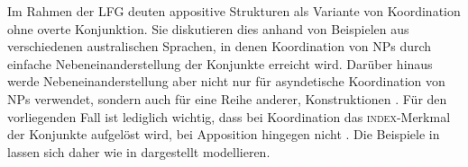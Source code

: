 Im Rahmen der LFG deuten \citet{sadlernordlinger2006} appositive Strukturen als
Variante von Koordination ohne overte Konjunktion. Sie diskutieren dies anhand
von Beispielen aus verschiedenen australischen Sprachen, in denen Koordination
von NPs durch einfache Nebeneinanderstellung der Konjunkte erreicht wird.
Darüber hinaus werde Nebeneinanderstellung aber nicht nur für asyndetische
Koordination von NPs verwendet, sondern auch für eine Reihe anderer,
 Konstruktionen
\autocite[440--441]{sadlernordlinger2006}. Für den vorliegenden Fall ist
lediglich wichtig, dass bei Koordination das \textsc{index}-Merkmal der
Konjunkte aufgelöst wird, bei Apposition hingegen nicht
\autocite[444]{sadlernordlinger2006}. Die Beispiele in
 lassen sich daher wie in
 dargestellt modellieren.

